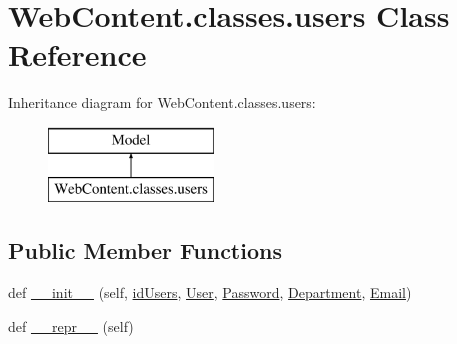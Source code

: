 \hypertarget{class_web_content_1_1classes_1_1users}{}\section{Web\+Content.\+classes.\+users Class Reference}
\label{class_web_content_1_1classes_1_1users}
Inheritance diagram for Web\+Content.\+classes.\+users\+:\begin{figure}[H]
\begin{center}
\leavevmode
\includegraphics[height=2.000000cm]{class_web_content_1_1classes_1_1users}
\end{center}
\end{figure}
\subsection*{Public Member Functions}
\begin{DoxyCompactItemize}
\item 
def \hyperlink{class_web_content_1_1classes_1_1users_aa7a3c863509284695380f9e80022fbb7}{\+\_\+\+\_\+init\+\_\+\+\_\+} (self, \hyperlink{class_web_content_1_1classes_1_1users_ac626a21b539eab7dfd3170533ff98fad}{id\+Users}, \hyperlink{class_web_content_1_1classes_1_1users_a083d6c2ba8164a0edfdfba1e889829a4}{User}, \hyperlink{class_web_content_1_1classes_1_1users_a5e0e733ebeee5a02bcf563995196f295}{Password}, \hyperlink{class_web_content_1_1classes_1_1users_a0cff7737b58d91bf3502af5813c811d2}{Department}, \hyperlink{class_web_content_1_1classes_1_1users_aa3bdfac54124d297b6ac81a2ba5564f7}{Email})
\item 
def \hyperlink{class_web_content_1_1classes_1_1users_a84e8d242e4e64e56b9a038f2927ae71b}{\+\_\+\+\_\+repr\+\_\+\+\_\+} (self)
\end{DoxyCompactItemize}
